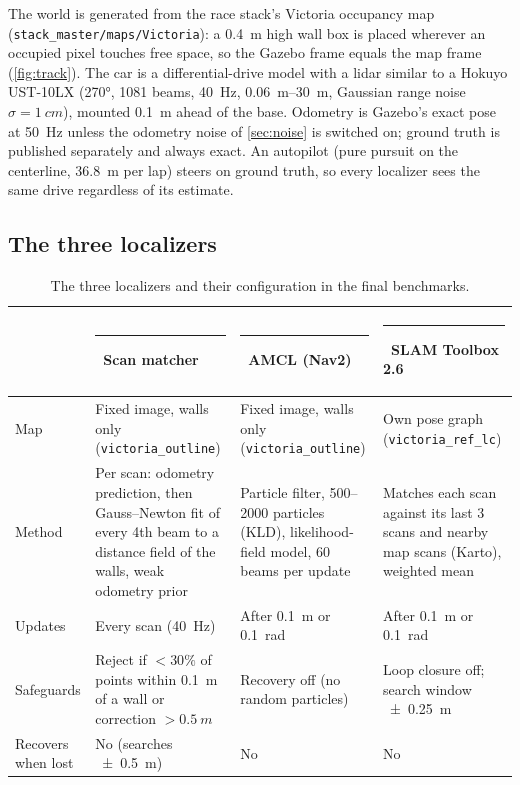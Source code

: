 \documentclass[11pt,letterpaper]{article}
\newcommand{\swatch}[1]{\textcolor{#1}{\rule[0.05em]{0.75em}{0.75em}}}
\newcommand{\code}[1]{\texttt{#1}}
\begin{document}
The world is generated from the race stack's Victoria occupancy map
(\code{stack\_master/\allowbreak maps/\allowbreak Victoria}): a \SI{0.4}{m} high wall box is placed wherever an occupied
pixel touches free space, so the Gazebo frame equals the map frame (\cref{fig:track}). The car is a
differential-drive model with a lidar similar to a Hokuyo UST-10LX (\ang{270}, 1081 beams,
\SI{40}{Hz}, \SIrange{0.06}{30}{m}, Gaussian range noise $\sigma=\SI{1}{cm}$), mounted
\SI{0.1}{m} ahead of the base. Odometry is Gazebo's exact pose at \SI{50}{Hz} unless the odometry
noise of \cref{sec:noise} is switched on; ground truth is published separately and always exact.
An autopilot (pure pursuit on the centerline, \SI{36.8}{m} per lap) steers on ground truth, so
every localizer sees the same drive regardless of its estimate.

\subsection{The three localizers}

\begin{table}[htbp]
  \centering\small
  \caption{The three localizers and their configuration in the final benchmarks.}
  \label{tab:localizers}
  \begin{tabularx}{\linewidth}{@{}>{\raggedright\arraybackslash}p{2.2cm}>{\raggedright\arraybackslash}X
                                >{\raggedright\arraybackslash}X>{\raggedright\arraybackslash}X@{}}
    \toprule
    & \swatch{scan}~Scan matcher & \swatch{amcl}~AMCL (Nav2) & \swatch{slam}~SLAM Toolbox 2.6 \\
    \midrule
    Map & Fixed image, walls only (\code{victoria\_outline}) & Fixed image, walls only
        (\code{victoria\_outline}) & Own pose graph (\code{victoria\_ref\_lc}) \\
    Method & Per scan: odometry prediction, then Gauss--Newton fit of every 4th beam to a distance
        field of the walls, weak odometry prior & Particle filter, 500--2000 particles (KLD),
        likelihood-field model, 60 beams per update & Matches each scan against its last 3 scans
        and nearby map scans (Karto), weighted mean \\
    Updates & Every scan (\SI{40}{Hz}) & After \SI{0.1}{m} or \SI{0.1}{rad} & After \SI{0.1}{m} or
        \SI{0.1}{rad} \\
    Safeguards & Reject if $<30\%$ of points within \SI{0.1}{m} of a wall or correction
        $>\SI{0.5}{m}$ & Recovery off (no random particles) & Loop closure off; search window
        \SI{\pm0.25}{m} \\
    Recovers when lost & No (searches \SI{\pm0.5}{m}) & No & No \\
    \bottomrule
  \end{tabularx}
\end{table}
\end{document}
